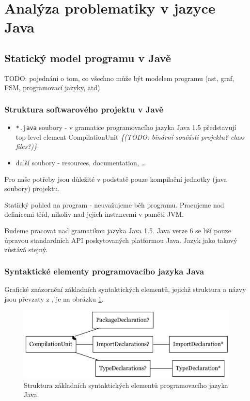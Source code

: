 \section{Analýza problematiky v jazyce Java}

\subsection{Statický model programu v Javě}
TODO: pojednání o tom, co všechno může být modelem programu (ast, graf, FSM, programovací jazyky, atd)

\subsubsection{Struktura softwarového projektu v Javě}

\begin{itemize}
\item\verb+*.java+ soubory - v gramatice programovacího jazyka Java 1.5 představují top-level element CompilationUnit \emph{\{(TODO: binární součásti projektu? class files?)\}}
\item další soubory - resources, documentation, \ldots
\end{itemize}

Pro naše potřeby jsou důležité v podstatě pouze kompilační jednotky (java soubory) projektu.

Statický pohled na program - neuvažujeme běh programu. Pracujeme nad definicemi tříd, nikoliv nad jejich instancemi v paměti JVM.

Budeme pracovat nad gramatikou jazyka Java 1.5. Java verze 6 se liší pouze úpravou standardních API poskytovaných platformou Java. Jazyk jako takový zůstává stejný.

\subsubsection{Syntaktické elementy programovacího jazyka Java}
Grafické znázornění základních syntaktických elementů, jejichž struktura a názvy jsou převzaty z \cite{Gosling:2005:JLS:1036643}, je na obrázku \ref{toplevel_elements}.
\begin{figure}[h!]
\centering
\includegraphics[width=\textwidth]{./graphs/java_top_elements.png}
\caption{Struktura základních syntaktických elementů programovacího jazyka Java.\label{toplevel_elements}}
\end{figure}

